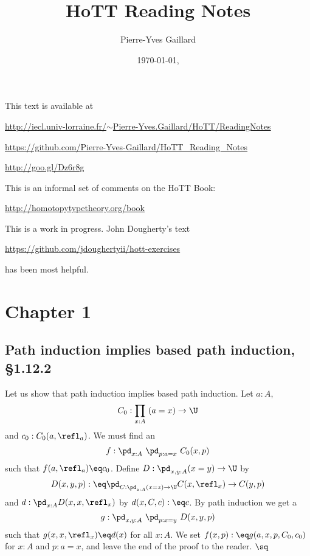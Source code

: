 \documentclass[12pt]{article}
\title{HoTT Reading Notes}
\author{Pierre-Yves Gaillard}
\date{\today, \currenttime}
\begin{document}

\maketitle%

\nn This text is available at 

\nn\href{http://iecl.univ-lorraine.fr/~Pierre-Yves.Gaillard/HoTT/ReadingNotes}{http://iecl.univ-lorraine.fr/$\sim$Pierre-Yves.Gaillard/HoTT/ReadingNotes}


\nn\href{https://github.com/Pierre-Yves-Gaillard/HoTT_Reading_Notes}{https://github.com/Pierre-Yves-Gaillard/HoTT\_Reading\_Notes}

\nn\href{http://goo.gl/Dz6r8g}{http://goo.gl/Dz6r8g}

This is an informal set of comments on the HoTT Book:

\nn\href{http://homotopytypetheory.org/book}{http://homotopytypetheory.org/book}

This is a work in progress. John Dougherty's text 

\nn\href{https://github.com/jdoughertyii/hott-exercises}{https://github.com/jdoughertyii/hott-exercises}

\nn has been most helpful.

\tableofcontents%


\section{Chapter 1}

\subsection{Path induction implies based path induction, \S1.12.2}%

Let us show that path induction implies based path induction. Let $a:A$, 
$$
C_0:\prod_{x:A}\ (a=x)\to\U
$$ 
and $c_0:C_0(a,\refl_a)$. We must find an 
$$
f:\pd_{x:A}\ \pd_{p:a=x}\ C_0(x,p)
$$ 
such that $f(a,\refl_a)\eq c_0$. Define $D:\pd_{x,y:A}(x=y)\to\U$ by 
$$
D(x,y,p):\eq\pd_{C:\pd_{z:A}(x=z)\to\U}C(x,\refl_x)\to C(y,p)
$$ 
and $d:\pd_{x:A}D(x,x,\refl_x)$ by $d(x,C,c):\eq c$. By path induction we get a 
$$
g:\pd_{x,y:A}\ \pd_{p:x=y}\ D(x,y,p)
$$ 
such that $g(x,x,\refl_x)\eq d(x)$ for all $x:A$. We set $f(x,p):\eq g(a,x,p,C_0,c_0)$ for $x:A$ and $p:a=x$, and leave the end of the proof to the reader. $\sq$
\end{document}
